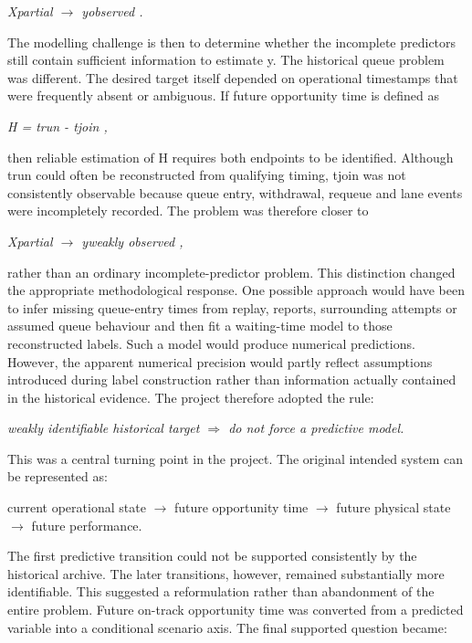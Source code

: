 \begin{center}\textit{Xpartial \ensuremath{\rightarrow} yobserved .}\end{center}

The modelling challenge is then to determine whether the incomplete predictors still contain sufficient information to estimate y. The historical queue problem was different. The desired target itself depended on operational timestamps that were frequently absent or ambiguous. If future opportunity time is defined as

\begin{center}\textit{H = trun - tjoin ,}\end{center}

then reliable estimation of H requires both endpoints to be identified. Although trun could often be reconstructed from qualifying timing, tjoin was not consistently observable because queue entry, withdrawal, requeue and lane events were incompletely recorded. The problem was therefore closer to

\begin{center}\textit{Xpartial \ensuremath{\rightarrow} yweakly observed ,}\end{center}

rather than an ordinary incomplete-predictor problem. This distinction changed the appropriate methodological response. One possible approach would have been to infer missing queue-entry times from replay, reports, surrounding attempts or assumed queue behaviour and then fit a waiting-time model to those reconstructed labels. Such a model would produce numerical predictions. However, the apparent numerical precision would partly reflect assumptions introduced during label construction rather than information actually contained in the historical evidence. The project therefore adopted the rule:

\begin{center}\textit{weakly identifiable historical target \ensuremath{\Rightarrow} do not force a predictive model.}\end{center}

This was a central turning point in the project. The original intended system can be represented as:

current operational state \ensuremath{\rightarrow} future opportunity time \ensuremath{\rightarrow} future physical state \ensuremath{\rightarrow} future performance.

The first predictive transition could not be supported consistently by the historical archive. The later transitions, however, remained substantially more identifiable. This suggested a reformulation rather than abandonment of the entire problem. Future on-track opportunity time was converted from a predicted variable into a conditional scenario axis. The final supported question became:

